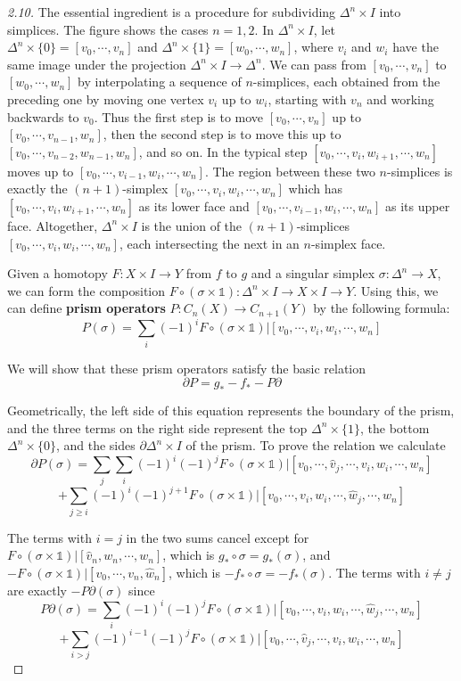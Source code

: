 \begin{proof}[2.10]
 The essential ingredient is a procedure for
subdividing $\Delta^n \times I$ into simplices. The figure shows the
cases $n = 1, 2$. In $\Delta^n \times I$, let $\Delta^n \times \{0\} = [v_0,\cdots,v_n]$
and $\Delta^n \times \{1\} = [w_0,\cdots,w_n]$, where $v_i$ and $w_i$ have the
same image under the projection $\Delta^n \times I \to \Delta^n$. We can pass
from $[v_0,\cdots,v_n]$ to $[w_0,\cdots,w_n]$ by interpolating a sequence of $n$-simplices, each obtained from the preceding
one by moving one vertex $v_i$ up to $w_i$, starting with $v_n$
and working backwards to $v_0$. Thus the first step is to
move $[v_0,\cdots,v_n]$ up to $[v_0,\cdots,v_{n-1},w_n]$, then the second step is to move this up to $[v_0,\cdots,v_{n-2},w_{n-1},w_n]$,
and so on. In the typical step $[v_0,\cdots,v_i,w_{i+1},\cdots,w_n]$
moves up to $[v_0,\cdots,v_{i-1},w_i,\cdots,w_n]$. The region between these two $n$-simplices is exactly the $(n+1)$-simplex
$[v_0,\cdots,v_i,w_i,\cdots,w_n]$ which has $[v_0,\cdots,v_i,w_{i+1},\cdots,w_n]$ as its lower face and
$[v_0,\cdots,v_{i-1},w_i,\cdots,w_n]$ as its upper face. Altogether, $\Delta^n \times I$ is the union of the
$(n+1)$-simplices $[v_0,\cdots,v_i,w_i,\cdots,w_n]$, each intersecting the next in an $n$-simplex
face.

Given a homotopy $F:X \times I \to Y$ from $f$ to $g$ and a singular simplex $\sigma:\Delta^n \to X$,
we can form the composition $F \circ (\sigma \times \mathbb{1}):\Delta^n \times I \to X \times I \to Y$. Using this, we can define
\textbf{prism operators} $P:C_n(X)\to C_{n+1}(Y)$ by the following formula:
$$P(\sigma) = \sum_i(-1)^i F \circ (\sigma \times \mathbb{1})|[v_0,\cdots,v_i,w_i,\cdots,w_n]$$

We will show that these prism operators satisfy the basic relation
$$\partial P = g_* - f_* - P\partial$$

Geometrically, the left side of this equation represents the boundary of the prism, and
the three terms on the right side represent the top $\Delta^n \times \{1\}$, the bottom $\Delta^n \times \{0\}$, and
the sides $\partial\Delta^n \times I$ of the prism. To prove the relation we calculate
$$\partial P(\sigma) = \sum_j\sum_i(-1)^i(-1)^jF \circ (\sigma \times \mathbb{1})|[v_0,\cdots,\hat v_j,\cdots,v_i,w_i,\cdots,w_n]$$
$$+ \sum_{j\geq i}(-1)^i(-1)^{j+1}F \circ (\sigma \times \mathbb{1})|[v_0,\cdots,v_i,w_i,\cdots,\hat w_j,\cdots,w_n]$$

The terms with $i = j$ in the two sums cancel except for $F \circ (\sigma \times \mathbb{1})|[\hat v_n,w_n,\cdots,w_n]$,
which is $g_*\circ\sigma = g_*(\sigma)$, and $-F \circ (\sigma \times \mathbb{1})|[v_0,\cdots,v_n,\hat w_n]$, which is $-f_*\circ\sigma = -f_*(\sigma)$.
The terms with $i \ne j$ are exactly $-P\partial(\sigma)$ since
$$P\partial(\sigma) = \sum_i(-1)^i(-1)^jF \circ (\sigma \times \mathbb{1})|[v_0,\cdots,v_i,w_i,\cdots,\hat w_j,\cdots,w_n]$$
$$+ \sum_{i>j}(-1)^{i-1}(-1)^jF \circ (\sigma \times \mathbb{1})|[v_0,\cdots,\hat v_j,\cdots,v_i,w_i,\cdots,w_n]$$


\end{proof}
